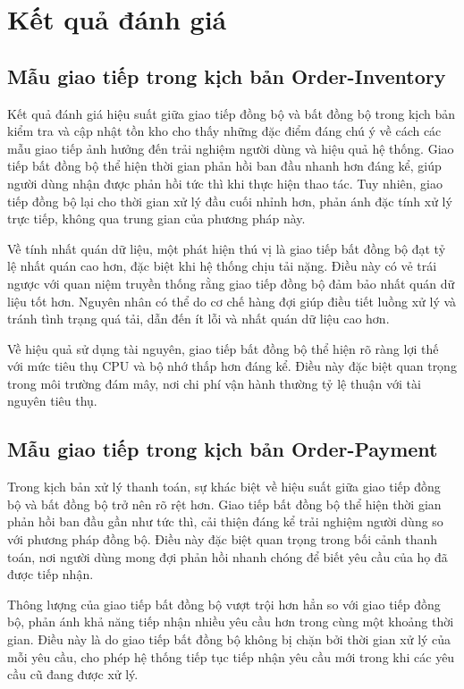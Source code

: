 \section{Kết quả đánh giá}

\subsection{Mẫu giao tiếp trong kịch bản Order-Inventory}
Kết quả đánh giá hiệu suất giữa giao tiếp đồng bộ và bất đồng bộ trong kịch bản kiểm tra và cập nhật tồn kho cho thấy những đặc điểm đáng chú ý về cách các mẫu giao tiếp ảnh hưởng đến trải nghiệm người dùng và hiệu quả hệ thống. Giao tiếp bất đồng bộ thể hiện thời gian phản hồi ban đầu nhanh hơn đáng kể, giúp người dùng nhận được phản hồi tức thì khi thực hiện thao tác. Tuy nhiên, giao tiếp đồng bộ lại cho thời gian xử lý đầu cuối nhỉnh hơn, phản ánh đặc tính xử lý trực tiếp, không qua trung gian của phương pháp này.

Về tính nhất quán dữ liệu, một phát hiện thú vị là giao tiếp bất đồng bộ đạt tỷ lệ nhất quán cao hơn, đặc biệt khi hệ thống chịu tải nặng. Điều này có vẻ trái ngược với quan niệm truyền thống rằng giao tiếp đồng bộ đảm bảo nhất quán dữ liệu tốt hơn. Nguyên nhân có thể do cơ chế hàng đợi giúp điều tiết luồng xử lý và tránh tình trạng quá tải, dẫn đến ít lỗi và nhất quán dữ liệu cao hơn.

Về hiệu quả sử dụng tài nguyên, giao tiếp bất đồng bộ thể hiện rõ ràng lợi thế với mức tiêu thụ CPU và bộ nhớ thấp hơn đáng kể. Điều này đặc biệt quan trọng trong môi trường đám mây, nơi chi phí vận hành thường tỷ lệ thuận với tài nguyên tiêu thụ.

\subsection{Mẫu giao tiếp trong kịch bản Order-Payment}
Trong kịch bản xử lý thanh toán, sự khác biệt về hiệu suất giữa giao tiếp đồng bộ và bất đồng bộ trở nên rõ rệt hơn. Giao tiếp bất đồng bộ thể hiện thời gian phản hồi ban đầu gần như tức thì, cải thiện đáng kể trải nghiệm người dùng so với phương pháp đồng bộ. Điều này đặc biệt quan trọng trong bối cảnh thanh toán, nơi người dùng mong đợi phản hồi nhanh chóng để biết yêu cầu của họ đã được tiếp nhận.

Thông lượng của giao tiếp bất đồng bộ vượt trội hơn hẳn so với giao tiếp đồng bộ, phản ánh khả năng tiếp nhận nhiều yêu cầu hơn trong cùng một khoảng thời gian. Điều này là do giao tiếp bất đồng bộ không bị chặn bởi thời gian xử lý của mỗi yêu cầu, cho phép hệ thống tiếp tục tiếp nhận yêu cầu mới trong khi các yêu cầu cũ đang được xử lý.

